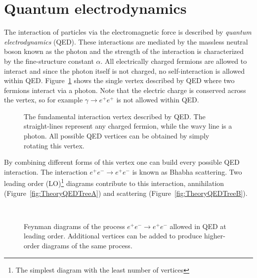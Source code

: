 \section{Quantum electrodynamics}

The interaction of particles via the electromagnetic force is described by \emph{quantum electrodynamics} (QED). These interactions are mediated by the massless neutral boson known as the photon and the strength of the interaction is characterized by the fine-structure constant $\alpha$. All electrically charged fermions are allowed to interact and since the photon itself is not charged, no self-interaction is allowed within QED\@. Figure~\ref{fig:TheorySimpleQED} shows the single vertex described by QED where two fermions interact via a photon. Note that the electric charge is conserved across the vertex, so for example $\gamma\rightarrow e^{+}e^{+}$ is not allowed within QED\@.

\begin{figure}[htbp]
  \centering
    
    \caption[The fundamental interaction vertex described by QED.]{The fundamental interaction vertex described by QED. The straight-lines represent any charged fermion, while the wavy line is a photon. All possible QED vertices can be obtained by simply rotating this vertex.}\label{fig:TheorySimpleQED}
\end{figure}

By combining different forms of this vertex one can build every possible QED interaction. The interaction $e^{+}e^{-}\rightarrow e^{+}e^{-}$ is known as Bhabha scattering. Two leading order (LO)\footnote{The simplest diagram with the least number of vertices} diagrams contribute to this interaction, annihilation (Figure~\ref{fig:TheoryQEDTreeA}) and scattering (Figure~\ref{fig:TheoryQEDTreeB}).

\begin{figure}[htbp]
  \centering
    \begin{minipage}[][][t]{.47\textwidth}
      \centering
        
        \label{fig:TheoryQEDTreeA}
    \end{minipage}
    \,
    \begin{minipage}[][][t]{.47\textwidth}
      \centering
        
        \label{fig:TheoryQEDTreeB}
    \end{minipage}
    \caption[Feynman diagrams of the process $e^{+}e^{-}\rightarrow e^{+}e^{-}$ allowed in QED at leading order.]{Feynman diagrams of the process $e^{+}e^{-}\rightarrow e^{+}e^{-}$ allowed in QED at leading order. Additional vertices can be added to produce higher-order diagrams of the same process.}\label{fig:TheoryQEDTree}
\end{figure}

